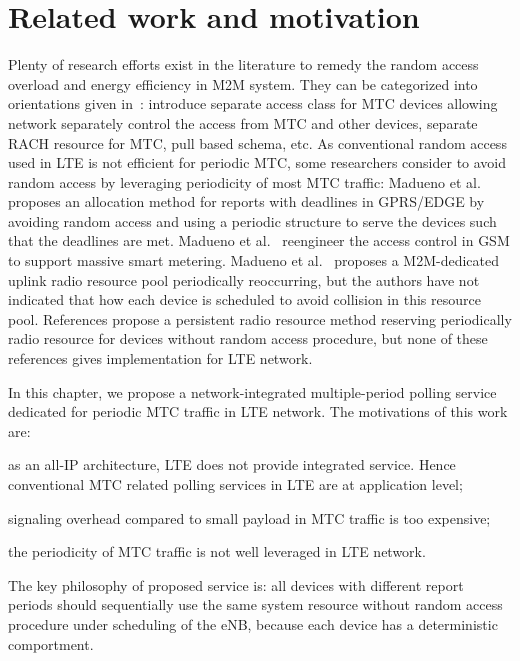 \section{Related work and motivation}
\label{sec:related-work}
Plenty of research efforts exist in the literature to remedy the random access overload and energy efficiency in M2M system. They can be categorized into orientations given in~\cite{3GPP/ranimprovements}: introduce separate access class for MTC devices allowing network separately control the access from MTC and other devices, separate RACH resource for MTC, pull based schema, etc.
As conventional random access used in LTE is not efficient for periodic MTC, some researchers consider to avoid random access by leveraging periodicity of most MTC traffic: Madueno et al.~\cite{madueno2013many} proposes an allocation method for reports with deadlines in GPRS/EDGE by avoiding random access and using a periodic structure to serve the devices such that the deadlines are met. Madueno et al.~\cite{madueno2014reengineering} reengineer the access control in GSM to support massive smart metering.
Madueno et al.~\cite{GCMadueno14} proposes a M2M-dedicated uplink radio resource pool periodically reoccurring, but the authors have not indicated that how each device is scheduled to avoid collision in this resource pool.
References \cite{you2014radio}\cite{Zhangy14} propose a persistent radio resource method reserving periodically radio resource for devices without random access procedure, 
but none of these references gives implementation for LTE network. 

In this chapter, we propose a network-integrated multiple-period polling service dedicated for periodic MTC traffic in LTE network. The motivations of this work are:\begin{inparaenum}[i)]
	\item as an all-IP architecture, LTE does not provide integrated service. Hence conventional MTC related polling services in LTE are at application level;
	\item signaling overhead compared to small payload in MTC traffic is too expensive;
	\item the periodicity of MTC traffic is not well leveraged in LTE network. 
\end{inparaenum}
The key philosophy of proposed service is: all devices with different report periods should sequentially use the same system resource without random access procedure under scheduling of the eNB, because each device has a deterministic comportment. 


